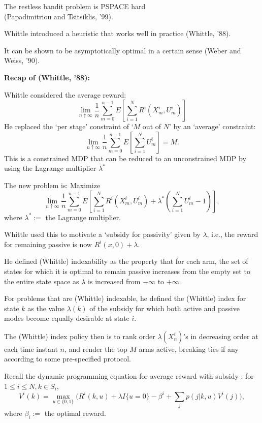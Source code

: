 \documentclass{slides}
\begin{document}
 {\large \color{dblue}
 
 The restless bandit  problem is PSPACE hard\\ (Papadimitriou and Tsitsiklis, '99). 
 
 Whittle introduced a heuristic that works well in practice (Whittle, '88).
 
 It can be shown to be asymptotically optimal in a certain sense (Weber and Weiss, '90).
 
 
 \newpage
 

 
 \textbf{Recap of (Whittle, '88):}
 
 Whittle considered the average reward:
 $$\lim_{n\uparrow\infty}\frac{1}{n}\sum_{m=0}^{n-1}E\left[\sum_{i=1}^NR^i(X^i_m,U^i_m)\right]$$
 He replaced the `per stage' constraint of `$M$ out of $N$' by an `average' constraint:
 $$\lim_{n\uparrow\infty}\frac{1}{n}\sum_{m=0}^{n-1}E\left[\sum_{i=1}^NU^i_m\right] = M.$$
This is a constrained MDP that can be reduced to an unconstrained MDP by using the Lagrange multiplier $\lambda^*$

\newpage

The new problem is:  Maximize
$$\lim_{n\uparrow\infty}\frac{1}{n}\sum_{m=0}^{n-1}E\left[\sum_{i=1}^NR^i(X^i_m,U^i_m) + \lambda^*(\sum_{i=1}^NU^i_m-1)\right],$$
where $\lambda^* :=$ the Lagrange multiplier. 

Whittle used this to motivate a {\color{red} `subsidy for passivity'} given by $\lambda$, i.e., the reward for remaining passive is now $R^i(x,0) + \lambda$.

He defined {\color{red} (Whittle) indexability} as the property that for each arm,  the set of states for which it is optimal to remain passive {\color{red} increases} from the empty set to the entire state space as $\lambda$ is increased from $-\infty$ to $+\infty$.

\newpage

For problems that are (Whittle) indexable, he defined the {\color{red} (Whittle) index} for state $k$ as the value $\lambda(k)$ of the subsidy for which both active and passive modes become equally desirable at state $i$.

The {\color{red} (Whittle) index policy} then is to rank order $\lambda(X^i_n)$'s in decreasing order at each time instant $n$, and render the top $M$ arms active, breaking ties if any according to some pre-specified protocol.

\newpage

Recall the dynamic programming equation for average reward with subsidy : for $1 \leq i \leq N, k \in S_i$, 
$$V^i(k) = \max_{u\in\{0,1\}}\Big(R^i(k,u) + \lambda I\{u=0\} - \beta^i + \sum_jp(j|k,u)V^i(j)\Big),$$
where $\beta_i :=$ the optimal reward.

}
\end{document}
